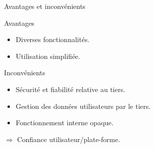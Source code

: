 \begin{frame}{Avantages et inconvénients}
    \begin{block}{Avantages}
        \begin{itemize}
            \item Diverses fonctionnalités.
            \item Utilisation simplifiée.
        \end{itemize}
    \end{block}
    \begin{block}{Inconvénients}
        \begin{itemize}
            \item Sécurité et fiabilité relative au tiers.
            \item Gestion des données utilisateurs par le tiers.
            \item Fonctionnement interne opaque.
        \end{itemize}
        $\Rightarrow$ Confiance utilisateur/plate-forme.
    \end{block}
\end{frame}